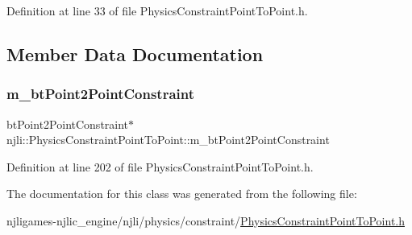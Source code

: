 Definition at line 33 of file Physics\+Constraint\+Point\+To\+Point.\+h.



\subsection{Member Data Documentation}
\mbox{\label{classnjli_1_1_physics_constraint_point_to_point_a54d76a95cd5fd595cc8c71715479cccf}} 
\subsubsection{\texorpdfstring{m\+\_\+bt\+Point2\+Point\+Constraint}{m\_btPoint2PointConstraint}}
{\footnotesize\ttfamily bt\+Point2\+Point\+Constraint$\ast$ njli\+::\+Physics\+Constraint\+Point\+To\+Point\+::m\+\_\+bt\+Point2\+Point\+Constraint\hspace{0.3cm}{\ttfamily [private]}}



Definition at line 202 of file Physics\+Constraint\+Point\+To\+Point.\+h.



The documentation for this class was generated from the following file\+:\begin{DoxyCompactItemize}
\item 
njligames-\/njlic\+\_\+engine/njli/physics/constraint/\mbox{\hyperlink{_physics_constraint_point_to_point_8h}{Physics\+Constraint\+Point\+To\+Point.\+h}}\end{DoxyCompactItemize}
